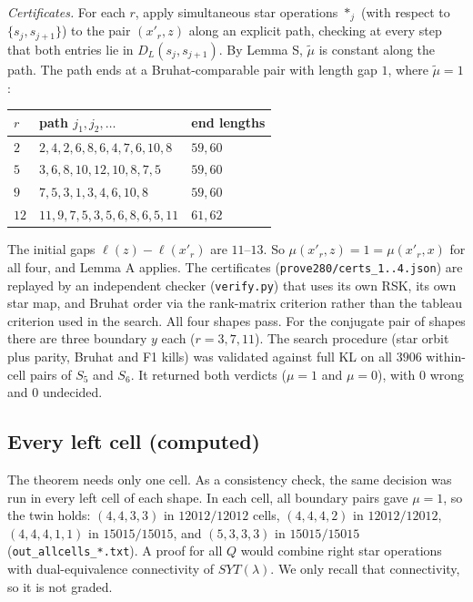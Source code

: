 \documentclass[11pt]{amsart}
\newcommand{\gr}[1]{\textsf{#1}}
\theoremstyle{definition}
\theoremstyle{remark}
\newcommand{\tmu}{\tilde\mu}
\begin{document}
\emph{Certificates.} For each $r$, apply simultaneous star operations $*_j$ (with respect to $\{s_j,s_{j+1}\}$) to the pair $(x'_r,z)$ along an explicit path, checking at every step that both entries lie in $D_L(s_j,s_{j+1})$. By Lemma S, $\tmu$ is constant along the path. The path ends at a Bruhat-comparable pair with length gap $1$, where $\tmu=1$:
\begin{center}\small
\begin{tabular}{@{}lll@{}}\toprule
$r$ & path $j_1,j_2,\dots$ & end lengths\\\midrule
$2$ & $2,4,2,6,8,6,4,7,6,10,8$ & $59,60$\\
$5$ & $3,6,8,10,12,10,8,7,5$ & $59,60$\\
$9$ & $7,5,3,1,3,4,6,10,8$ & $59,60$\\
$12$ & $11,9,7,5,3,5,6,8,6,5,11$ & $61,62$\\\bottomrule
\end{tabular}
\end{center}
The initial gaps $\ell(z)-\ell(x'_r)$ are $11$--$13$. So $\mu(x'_r,z)=1=\mu(x'_r,x)$ for all four, and Lemma A applies. The certificates (\texttt{prove280/certs\_1..4.json}) are replayed by an independent checker (\texttt{verify.py}) that uses its own RSK, its own star map, and Bruhat order via the rank-matrix criterion rather than the tableau criterion used in the search. All four shapes pass. For the conjugate pair of shapes there are three boundary $y$ each ($r=3,7,11$). The search procedure (star orbit plus parity, Bruhat and F1 kills) was validated against full KL on all $3906$ within-cell pairs of $S_5$ and $S_6$. It returned both verdicts ($\mu=1$ and $\mu=0$), with $0$ wrong and $0$ undecided.

\subsection*{Every left cell (\gr{computed})}
The theorem needs only one cell. As a consistency check, the same decision was run in every left cell of each shape. In each cell, all boundary pairs gave $\mu=1$, so the twin holds: $(4,4,3,3)$ in $12012/12012$ cells, $(4,4,4,2)$ in $12012/12012$, $(4,4,4,1,1)$ in $15015/15015$, and $(5,3,3,3)$ in $15015/15015$ (\texttt{out\_allcells\_*.txt}). A proof for all $Q$ would combine right star operations with dual-equivalence connectivity of $SYT(\lambda)$. We only recall that connectivity, so it is not graded.

\end{document}
